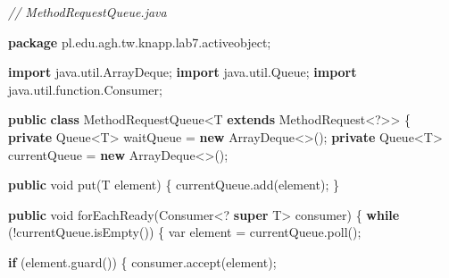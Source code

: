 \documentclass[11pt]{article}
\newenvironment{Shaded}{}{}
\newcommand{\KeywordTok}[1]{\textcolor[rgb]{0.00,0.44,0.13}{\textbf{{#1}}}}
\newcommand{\DataTypeTok}[1]{\textcolor[rgb]{0.56,0.13,0.00}{{#1}}}
\newcommand{\CommentTok}[1]{\textcolor[rgb]{0.38,0.63,0.69}{\textit{{#1}}}}
\newcommand{\FunctionTok}[1]{\textcolor[rgb]{0.02,0.16,0.49}{{#1}}}
\newcommand{\NormalTok}[1]{{#1}}
\newcommand{\ImportTok}[1]{{#1}}
\newcommand{\ControlFlowTok}[1]{\textcolor[rgb]{0.00,0.44,0.13}{\textbf{{#1}}}}
\newcommand{\OperatorTok}[1]{\textcolor[rgb]{0.40,0.40,0.40}{{#1}}}
\newcommand{\BuiltInTok}[1]{{#1}}
\begin{document}
\begin{Shaded}
\begin{Highlighting}[]
\CommentTok{// MethodRequestQueue.java}

\KeywordTok{package}\ImportTok{ pl}\OperatorTok{.}\ImportTok{edu}\OperatorTok{.}\ImportTok{agh}\OperatorTok{.}\ImportTok{tw}\OperatorTok{.}\ImportTok{knapp}\OperatorTok{.}\ImportTok{lab7}\OperatorTok{.}\ImportTok{activeobject}\OperatorTok{;}

\KeywordTok{import} \ImportTok{java}\OperatorTok{.}\ImportTok{util}\OperatorTok{.}\ImportTok{ArrayDeque}\OperatorTok{;}
\KeywordTok{import} \ImportTok{java}\OperatorTok{.}\ImportTok{util}\OperatorTok{.}\ImportTok{Queue}\OperatorTok{;}
\KeywordTok{import} \ImportTok{java}\OperatorTok{.}\ImportTok{util}\OperatorTok{.}\ImportTok{function}\OperatorTok{.}\ImportTok{Consumer}\OperatorTok{;}

\KeywordTok{public} \KeywordTok{class}\NormalTok{ MethodRequestQueue}\OperatorTok{\textless{}}\NormalTok{T }\KeywordTok{extends}\NormalTok{ MethodRequest}\OperatorTok{\textless{}?\textgreater{}\textgreater{}} \OperatorTok{\{}
    \KeywordTok{private} \BuiltInTok{Queue}\OperatorTok{\textless{}}\NormalTok{T}\OperatorTok{\textgreater{}}\NormalTok{ waitQueue }\OperatorTok{=} \KeywordTok{new} \BuiltInTok{ArrayDeque}\OperatorTok{\textless{}\textgreater{}();}
    \KeywordTok{private} \BuiltInTok{Queue}\OperatorTok{\textless{}}\NormalTok{T}\OperatorTok{\textgreater{}}\NormalTok{ currentQueue }\OperatorTok{=} \KeywordTok{new} \BuiltInTok{ArrayDeque}\OperatorTok{\textless{}\textgreater{}();}

    \KeywordTok{public} \DataTypeTok{void} \FunctionTok{put}\OperatorTok{(}\NormalTok{T element}\OperatorTok{)} \OperatorTok{\{}
\NormalTok{        currentQueue}\OperatorTok{.}\FunctionTok{add}\OperatorTok{(}\NormalTok{element}\OperatorTok{);}
    \OperatorTok{\}}

    \KeywordTok{public} \DataTypeTok{void} \FunctionTok{forEachReady}\OperatorTok{(}\NormalTok{Consumer}\OperatorTok{\textless{}?} \KeywordTok{super}\NormalTok{ T}\OperatorTok{\textgreater{}}\NormalTok{ consumer}\OperatorTok{)} \OperatorTok{\{}
        \ControlFlowTok{while} \OperatorTok{(!}\NormalTok{currentQueue}\OperatorTok{.}\FunctionTok{isEmpty}\OperatorTok{())} \OperatorTok{\{}
            \DataTypeTok{var}\NormalTok{ element }\OperatorTok{=}\NormalTok{ currentQueue}\OperatorTok{.}\FunctionTok{poll}\OperatorTok{();}

            \ControlFlowTok{if} \OperatorTok{(}\NormalTok{element}\OperatorTok{.}\FunctionTok{guard}\OperatorTok{())} \OperatorTok{\{}
\NormalTok{                consumer}\OperatorTok{.}\FunctionTok{accept}\OperatorTok{(}\NormalTok{element}\OperatorTok{);}


\end{Highlighting}
\end{Shaded}
\end{document}
